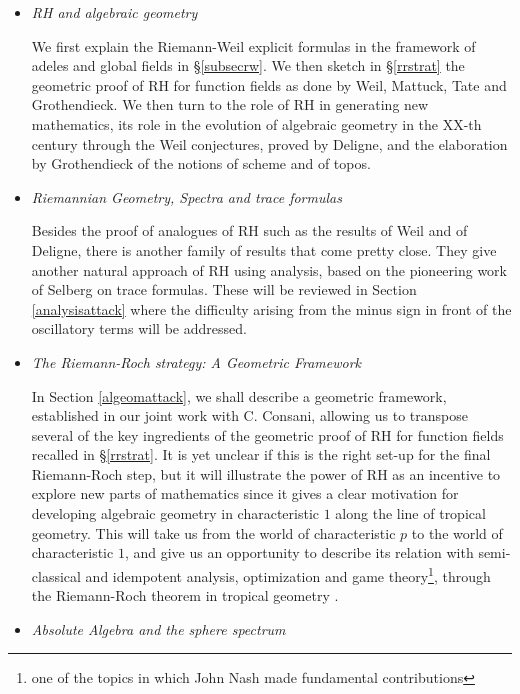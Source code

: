 \documentclass[12pt]{article}
\def\vsp{\vspace{.05in}}
\begin{document}
\begin{itemize}
\item {\it RH and algebraic geometry}

\vspace{.05in}
We first explain the Riemann-Weil explicit formulas in the framework of adeles and global fields in \S \ref{subsecrw}. We then sketch in \S \ref{rrstrat} the geometric proof of RH for function fields as done by Weil, Mattuck, Tate and Grothendieck. We then turn to the role of 
RH in generating new mathematics, its role in the evolution of algebraic geometry in the XX-th century through the Weil conjectures, proved by Deligne, and the elaboration by Grothendieck of the notions of scheme and of topos. 


\item{\it Riemannian Geometry, Spectra  and trace formulas} 

\vsp
Besides the proof of analogues of RH such as the results of Weil and of Deligne, there is another family of results that come pretty close. They give another natural approach of RH using analysis, based on the pioneering work of Selberg on trace formulas. These will be reviewed in Section \ref{analysisattack} where the difficulty arising from the minus sign in front of the oscillatory terms will be addressed.

\item{\it The Riemann-Roch strategy: A Geometric Framework} 

\vsp 
In Section \ref{algeomattack}, we shall describe a geometric framework, established in our joint work with C. Consani, allowing us to transpose several of the key ingredients of the geometric proof of RH for function fields recalled in \S \ref{rrstrat}. It is yet unclear if this is the right set-up for the final Riemann-Roch step, but  it will illustrate  the power of RH as an incentive to explore new parts of mathematics since it gives a clear motivation for developing algebraic geometry in characteristic $1$ along the line of tropical geometry. This will take us from the world of characteristic $p$ to the world of characteristic $1$, and give us an opportunity to describe its relation with semi-classical and idempotent analysis,  optimization and game theory\footnote{one of the topics in which John Nash made fundamental contributions}, through the Riemann-Roch theorem in tropical geometry \cite{BN,GK,MZ}.

\item {\it Absolute Algebra and the sphere spectrum} 


\end{itemize}
\end{document}
